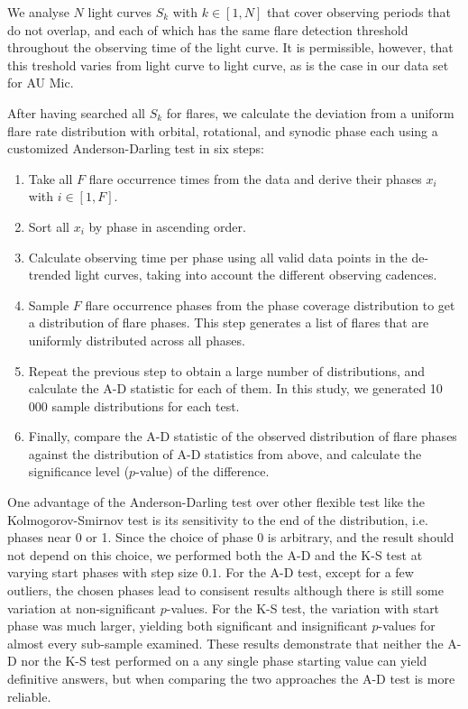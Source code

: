 \documentclass[fleqn,usenatbib,letters]{mnras}%
\begin{document}
We analyse $N$ light curves $S_k$ with $k\in [1,N]$ that cover observing periods that do not overlap, and each of which has the same flare detection threshold throughout the observing time of the light curve. It is permissible, however, that this treshold varies from light curve to light curve, as is the case in our data set for AU Mic.
 
After having searched all $S_k$ for flares, we calculate the deviation from a uniform flare rate distribution with orbital, rotational, and synodic phase each using a customized Anderson-Darling test in six steps:
\begin{enumerate}
\item Take all $F$ flare occurrence times from the data and derive their phases $x_i$ with $i \in [1,F]$. 
\item Sort all $x_i$ by phase in ascending order.
\item Calculate observing time per phase using all valid data points in the de-trended light curves, taking into account the different observing cadences.
\item Sample $F$ flare occurrence phases from the phase coverage distribution to get a distribution of flare phases. This step generates a list of flares that are uniformly distributed across all phases.
\item Repeat the previous step to obtain a large number of distributions, and calculate the A-D statistic for each of them.  In this study, we generated 10 000 sample distributions for each test.
\item Finally, compare the A-D statistic of the observed distribution of flare phases against the distribution of A-D statistics from above, and calculate the significance level ($p$-value) of the difference. 
\end{enumerate}

One advantage of the Anderson-Darling test over other flexible test like the Kolmogorov-Smirnov test is its sensitivity to the end of the distribution, i.e. phases near 0 or 1. Since the choice of phase 0 is arbitrary, and the result should not depend on this choice, we performed both the A-D and the K-S test at varying start phases with step size $0.1$. For the A-D test, except for a few outliers, the chosen phases lead to consisent results although there is still some variation at non-significant $p$-values. For the K-S test, the variation with start phase was much larger, yielding both significant and insignificant $p$-values for almost every sub-sample examined. These results demonstrate that neither the A-D nor the K-S test performed on a any single phase starting value can yield definitive answers, but when comparing the two approaches the A-D test is more reliable.
\end{document}
